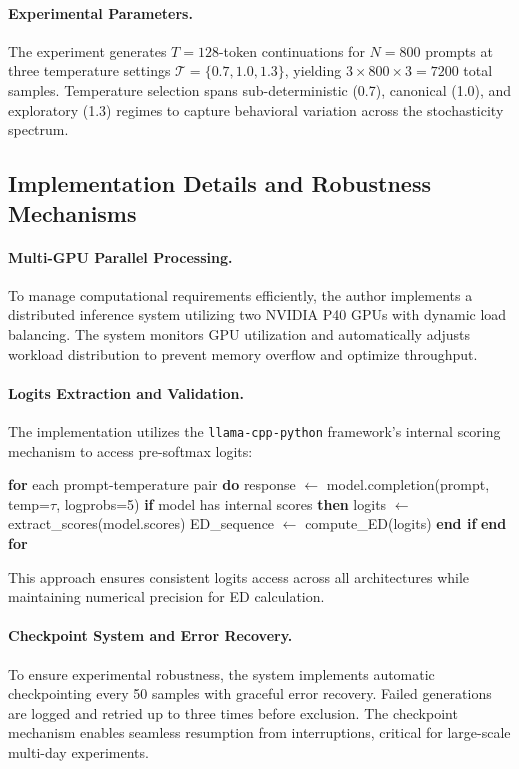 \documentclass[12pt]{article}
\begin{document}
\paragraph{Experimental Parameters.}
The experiment generates $T=128$-token continuations for $N=800$ prompts at three temperature settings $\mathcal{T}=\{0.7, 1.0, 1.3\}$, yielding $3 \times 800 \times 3 = 7200$ total samples. Temperature selection spans sub-deterministic (0.7), canonical (1.0), and exploratory (1.3) regimes to capture behavioral variation across the stochasticity spectrum.

\subsection{Implementation Details and Robustness Mechanisms}

\paragraph{Multi-GPU Parallel Processing.}
To manage computational requirements efficiently, the author implements a distributed inference system utilizing two NVIDIA P40 GPUs with dynamic load balancing. The system monitors GPU utilization and automatically adjusts workload distribution to prevent memory overflow and optimize throughput.

\paragraph{Logits Extraction and Validation.}
The implementation utilizes the \texttt{llama-cpp-python} framework's internal scoring mechanism to access pre-softmax logits:
\begin{algorithmic}[1]\label{alg:ed}
\State \textbf{for} each prompt-temperature pair \textbf{do}
\State \quad response $\gets$ model.completion(prompt, temp=$\tau$, logprobs=5)
\State \quad \textbf{if} model has internal scores \textbf{then}
\State \quad \quad logits $\gets$ extract\_scores(model.scores)
\State \quad \quad ED\_sequence $\gets$ compute\_ED(logits) 
\State \quad \textbf{end if}
\State \textbf{end for}
\end{algorithmic}

This approach ensures consistent logits access across all architectures while maintaining numerical precision for ED calculation.

\paragraph{Checkpoint System and Error Recovery.}
To ensure experimental robustness, the system implements automatic checkpointing every 50 samples with graceful error recovery. Failed generations are logged and retried up to three times before exclusion. The checkpoint mechanism enables seamless resumption from interruptions, critical for large-scale multi-day experiments.
\end{document}
